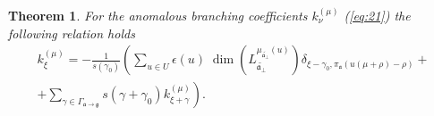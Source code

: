 \documentclass[12pt]{iopart}
\newtheorem{theorem}{Theorem}
\theoremstyle{definition}
\newcommand{\gf}{\mathfrak{g}}
\newcommand{\af}{\mathfrak{a}}
\begin{document}
\begin{theorem}
  For the anomalous branching coefficients $k^{(\mu)}_{\nu}$ (\ref{eq:21})
  the following relation holds
  \begin{equation}
    \label{recurrent-relation}
    \begin{array}{c}
      k_{\xi }^{\left( \mu \right) }=-\frac{1}{s\left( \gamma _{0}\right) }\left(
        \sum_{u\in U} \epsilon(u)\;
        \dim \left( L_{\widetilde{\af_{\perp }}}^{\mu
        _{\widetilde{\af_{\perp }}}\left( u\right) }\right)
        \delta_{\xi-\gamma_0,\pi_{\af}(u(\mu+\rho)-\rho)}+ \right.\\
      \left.
        +\sum_{\gamma \in
          \Gamma _{\af \rightarrow \gf}}s\left( \gamma +\gamma _{0}\right) k_{\xi
          +\gamma }^{\left( \mu \right) }\right).
    \end{array}
  \end{equation}
\end{theorem}
\end{document}
